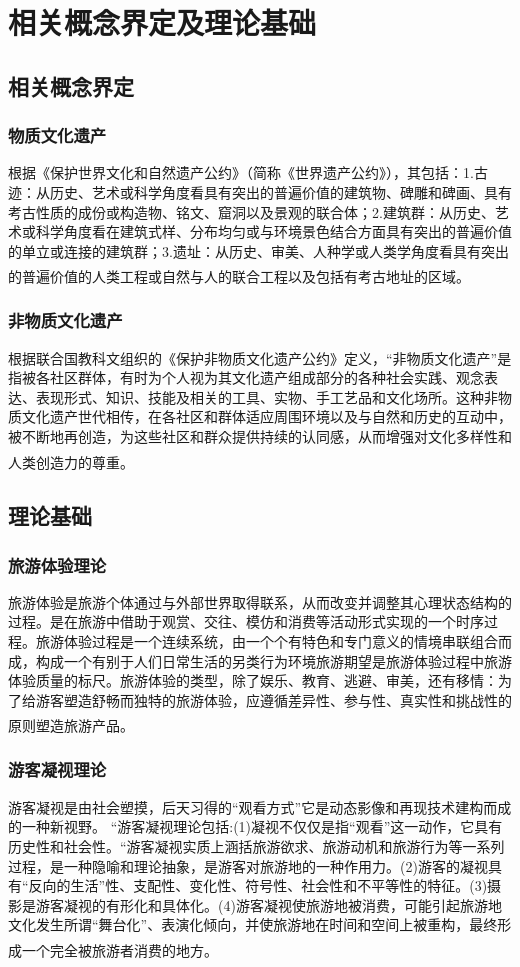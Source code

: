 \documentclass[UTF8]{ctexart}
\newcommand{\upcite}[1]{\textsuperscript{\textsuperscript{\cite{#1}}}}
\begin{document}
\section{相关概念界定及理论基础}
    \subsection{相关概念界定}
        \subsubsection{物质文化遗产}
        根据《保护世界文化和自然遗产公约》（简称《世界遗产公约》），其包括：1.古迹：从历史、艺术或科学角度看具有突出的普遍价值的建筑物、碑雕和碑画、具有考古性质的成份或构造物、铭文、窟洞以及景观的联合体；2.建筑群：从历史、艺术或科学角度看在建筑式样、分布均匀或与环境景色结合方面具有突出的普遍价值的单立或连接的建筑群；3.遗址：从历史、审美、人种学或人类学角度看具有突出的普遍价值的人类工程或自然与人的联合工程以及包括有考古地址的区域。\upcite{保护世界文化和自然遗产公约}
        \subsubsection{非物质文化遗产}
        根据联合国教科文组织的《保护非物质文化遗产公约》定义，“非物质文化遗产”是指被各社区群体，有时为个人视为其文化遗产组成部分的各种社会实践、观念表达、表现形式、知识、技能及相关的工具、实物、手工艺品和文化场所。这种非物质文化遗产世代相传，在各社区和群体适应周围环境以及与自然和历史的互动中，被不断地再创造，为这些社区和群众提供持续的认同感，从而增强对文化多样性和人类创造力的尊重。\upcite{保护非物质文化遗产公约}
    \subsection{理论基础}
        \subsubsection{旅游体验理论}
        旅游体验是旅游个体通过与外部世界取得联系，从而改变并调整其心理状态结构的过程。是在旅游中借助于观赏、交往、模仿和消费等活动形式实现的一个时序过程。旅游体验过程是一个连续系统，由一个个有特色和专门意义的情境串联组合而成，构成一个有别于人们日常生活的另类行为环境旅游期望是旅游体验过程中旅游体验质量的标尺。旅游体验的类型，除了娱乐、教育、逃避、审美，还有移情：为了给游客塑造舒畅而独特的旅游体验，应遵循差异性、参与性、真实性和挑战性的原则塑造旅游产品\upcite{旅游地学大辞典}。
        \subsubsection{游客凝视理论}
        游客凝视是由社会塑摸，后天习得的“观看方式”它是动态影像和再现技术建构而成的一种新视野。 “游客凝视理论包括:(1)凝视不仅仅是指“观看”这一动作，它具有历史性和社会性。“游客凝视实质上涵括旅游欲求、旅游动机和旅游行为等一系列过程，是一种隐喻和理论抽象，是游客对旅游地的一种作用力。(2)游客的凝视具有“反向的生活”性、支配性、变化性、符号性、社会性和不平等性的特征。(3)摄影是游客凝视的有形化和具体化。(4)游客凝视使旅游地被消费，可能引起旅游地文化发生所谓“舞台化”、表演化倾向，并使旅游地在时间和空间上被重构，最终形成一个完全被旅游者消费的地方\upcite{游客凝视}。
\end{document}
